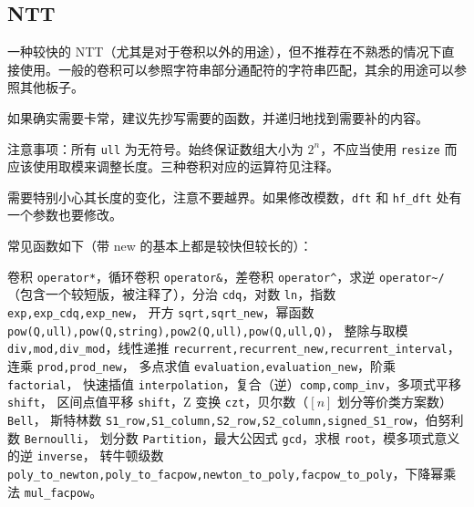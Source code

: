 \documentclass[12pt]{ctexart}
\begin{document}
\subsection{NTT}

一种较快的 NTT（尤其是对于卷积以外的用途），但不推荐在不熟悉的情况下直接使用。一般的卷积可以参照字符串部分通配符的字符串匹配，其余的用途可以参照其他板子。

如果确实需要卡常，建议先抄写需要的函数，并递归地找到需要补的内容。

注意事项：所有 \verb|ull| 为无符号。始终保证数组大小为 $2^n$，不应当使用 \verb|resize| 而应该使用取模来调整长度。三种卷积对应的运算符见注释。

需要特别小心其长度的变化，注意不要越界。如果修改模数，\verb|dft| 和 \verb|hf_dft| 处有一个参数也要修改。

常见函数如下（带 new 的基本上都是较快但较长的）：

卷积 \verb|operator*|，循环卷积 \verb|operator&|，差卷积 \verb|operator^|，求逆 \verb|operator~/|
（包含一个较短版，被注释了），分治 \verb|cdq|，对数 \verb|ln|，指数 \verb|exp,exp_cdq,exp_new|，
开方 \verb|sqrt,sqrt_new|，幂函数 \verb|pow(Q,ull),pow(Q,string),pow2(Q,ull),pow(Q,ull,Q)|，
整除与取模 \verb|div,mod,div_mod|，线性递推 \verb|recurrent,recurrent_new,recurrent_interval|，
连乘 \verb|prod,prod_new|，\newline
多点求值 \verb|evaluation,evaluation_new|，阶乘 \verb|factorial|，
快速插值 \verb|interpolation|，复合（逆）\verb|comp,comp_inv|，多项式平移 \verb|shift|，
区间点值平移 \verb|shift|，Z 变换 \verb|czt|，贝尔数（$[n]$ 划分等价类方案数）\verb|Bell|，
斯特林数 \verb|S1_row,S1_column,S2_row,S2_column,signed_S1_row|，伯努利数 \verb|Bernoulli|，
划分数 \verb|Partition|，最大公因式 \verb|gcd|，求根 \verb|root|，模多项式意义的逆 \verb|inverse|，
转牛顿级数 \verb|poly_to_newton,poly_to_facpow,newton_to_poly,facpow_to_poly|，下降幂乘法 \verb|mul_facpow|。
\end{document}
